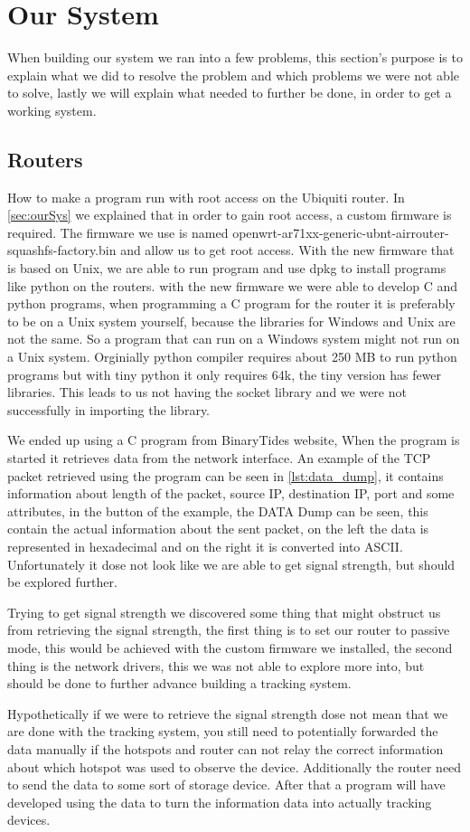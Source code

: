 \section{Our System}
When building our system we ran into a few problems, this section's purpose is to explain what we did to resolve the problem and which problems we were not able to solve, lastly we will explain what needed to further be done, in order to get a working system.

\subsection*{Routers}
How to make a program run with root access on the Ubiquiti router. In \cref{sec:ourSys} we explained that in order to gain root access, a custom firmware is required. The firmware we use is named openwrt-ar71xx-generic-ubnt-airrouter-squashfs-factory.bin and allow us to get root access. With the new firmware that is based on Unix, we are able to run program and use dpkg to install programs like python on the routers. with the new firmware we were able to develop C and python programs, when programming a C program for the router it is preferably to be on a Unix system yourself, because the libraries for Windows and Unix are not the same. So a program that can run on a Windows system might not run on a Unix system. Orginially python compiler requires about 250 MB to run python programs but with tiny python it only requires 64k, the tiny version has fewer libraries. This leads to us not having the socket library and we were not successfully in importing the library.

We ended up using a C program from BinaryTides website\cite{SnifferCode}, When the program is started it retrieves data from the network interface. An example of the TCP packet retrieved using the program can be seen in \cref{lst:data_dump}, it contains information about length of the packet, source IP, destination IP, port and some attributes, in the button of the example, the DATA Dump can be seen, this contain the actual information about the sent packet, on the left the data is represented in hexadecimal and on the right it is converted into ASCII. Unfortunately it dose not look like we are able to get signal strength, but should be explored further.

Trying to get signal strength we discovered some thing that might obstruct us from retrieving the signal strength, the first thing is to set our router to passive mode, this would be achieved with the custom firmware we installed, the second thing is the network drivers, this we was not able to explore more into, but should be done to further advance building a tracking system.

Hypothetically if we were to retrieve the signal strength dose not mean that we are done with the tracking system, you still need to potentially forwarded the data manually if the hotspots and router can not relay the correct information about which hotspot was used to observe the device. Additionally the router need to send the data to some sort of storage device. After that a program will have developed using the data to turn the information data into actually tracking devices.
